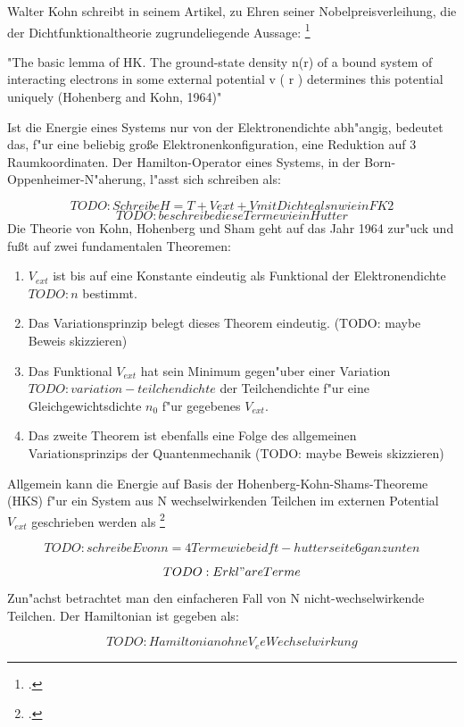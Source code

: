 Walter Kohn schreibt in seinem Artikel, zu Ehren seiner Nobelpreisverleihung, die der Dichtfunktionaltheorie zugrundeliegende Aussage: \footcite[7]{nobel-kohn}

"The basic lemma of HK. The ground-state density n(r) of a bound system of interacting electrons in some external potential v ( r ) determines this potential uniquely (Hohenberg and Kohn, 1964)"

Ist die Energie eines Systems nur von der Elektronendichte abh"angig, bedeutet das, f"ur eine beliebig große Elektronenkonfiguration, eine Reduktion auf 3 Raumkoordinaten. 
Der Hamilton-Operator eines Systems, in der Born-Oppenheimer-N"aherung, l"asst sich schreiben als: 

$$TODO: Schreibe H=T+Vext+V mit Dichte als n wie in FK2$$
$$TODO: beschreibe diese Terme wie in Hutter$$
Die Theorie von Kohn, Hohenberg und Sham geht auf das Jahr 1964 zur"uck und fußt auf zwei fundamentalen Theoremen: 


\begin{enumerate}
\item $V_{ext} $ ist bis auf eine Konstante eindeutig als Funktional der Elektronendichte $TODO:n$ bestimmt.
\item Das Variationsprinzip belegt dieses Theorem eindeutig. (TODO: maybe Beweis skizzieren)

\item Das Funktional $V_{ext}$ hat sein Minimum gegen"uber einer Variation $TODO:variation-teilchendichte$ der Teilchendichte f"ur eine Gleichgewichtsdichte $n_0$ f"ur gegebenes $V_{ext} $. 
\item Das zweite Theorem ist ebenfalls eine Folge des allgemeinen Variationsprinzips der Quantenmechanik (TODO: maybe Beweis skizzieren)

\end{enumerate}

Allgemein kann die Energie auf Basis der Hohenberg-Kohn-Shams-Theoreme (HKS) f"ur ein System aus N wechselwirkenden Teilchen im externen Potential $V_{ext} $ geschrieben werden als \footcite[6]{dft-hutter} 

$$TODO:schreibe E von n = 4 Terme wie bei dft-hutter seite 6 ganz unten$$

$$TODO:Erkl"are Terme$$


Zun"achst betrachtet man den einfacheren Fall von N nicht-wechselwirkende Teilchen. Der Hamiltonian ist gegeben als:

$$TODO: Hamiltonian ohne V_ee Wechselwirkung$$

